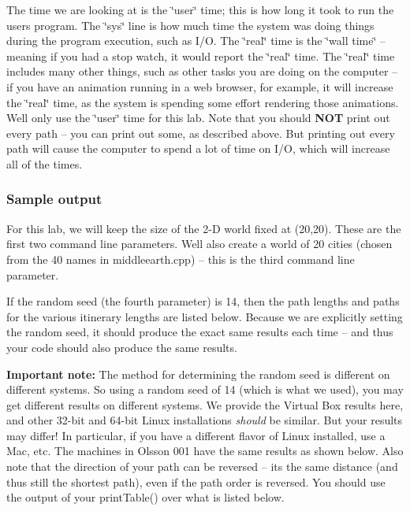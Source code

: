 The time we are looking at is the \char`\"{}user\char`\"{} time; this is how long it took to run the user\textquotesingle{}s program. The \char`\"{}sys\char`\"{} line is how much time the system was doing things during the program execution, such as I/O. The \char`\"{}real\char`\"{} time is the \char`\"{}wall time\char`\"{} -- meaning if you had a stop watch, it would report the \char`\"{}real\char`\"{} time. The \char`\"{}real\char`\"{} time includes many other things, such as other tasks you are doing on the computer -- if you have an animation running in a web browser, for example, it will increase the \char`\"{}real\char`\"{} time, as the system is spending some effort rendering those animations. We\textquotesingle{}ll only use the \char`\"{}user\char`\"{} time for this lab. Note that you should {\bfseries N\+OT} print out every path -- you can print out some, as described above. But printing out every path will cause the computer to spend a lot of time on I/O, which will increase all of the times.

\subsubsection*{Sample output}

For this lab, we will keep the size of the 2-\/D world fixed at (20,20). These are the first two command line parameters. We\textquotesingle{}ll also create a world of 20 cities (chosen from the 40 names in middleearth.\+cpp) -- this is the third command line parameter.

If the random seed (the fourth parameter) is 14, then the path lengths and paths for the various itinerary lengths are listed below. Because we are explicitly setting the random seed, it should produce the exact same results each time -- and thus your code should also produce the same results.

{\bfseries Important note\+:} The method for determining the random seed is different on different systems. So using a random seed of 14 (which is what we used), you may get different results on different systems. We provide the Virtual Box results here, and other 32-\/bit and 64-\/bit Linux installations {\itshape should} be similar. But your results may differ! In particular, if you have a different flavor of Linux installed, use a Mac, etc. The machines in Olsson 001 have the same results as shown below. Also note that the direction of your path can be reversed -- it\textquotesingle{}s the same distance (and thus still the shortest path), even if the path order is reversed. You should use the output of your {\ttfamily print\+Table()} over what is listed below.

